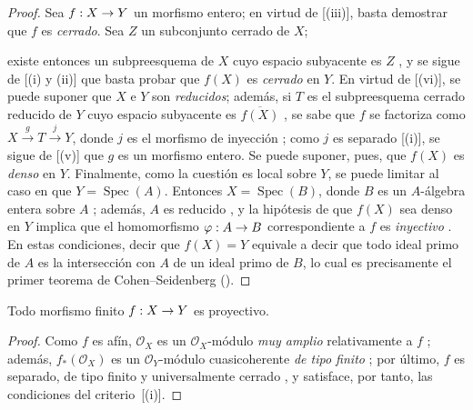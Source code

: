 \documentclass[oneside,10pt]{amsart}
\makeatletter
\newcommand{\ega@arrow}[2]{\mathchoice{#1}{#2}{#2}{#2}}
\renewcommand{\to}{\ega@arrow{\longrightarrow}{\rightarrow}}
\newcommand{\oldpage}[2][]{\marginnote{\normalfont\footnotesize\textbf{#1}~|~#2}\ignorespaces}
\let\EGAOriginalLabel\label
\renewcommand{\label}[1]{\phantomsection\EGAOriginalLabel{#1}}
\makeatother
\begin{document}
\begin{proof}
Sea $f:X\to Y$ un morfismo entero;
en virtud de [(iii)], basta demostrar que $f$ es \emph{cerrado}.
Sea $Z$ un subconjunto cerrado de $X$;


existe entonces un subpreesquema de $X$ 
\oldpage[II]{113}
cuyo espacio subyacente es $Z$ , y se sigue de [(i) y (ii)] que basta probar que $f(X)$ es \emph{cerrado} en $Y$.
En virtud de [(vi)], se puede suponer que $X$ e $Y$ son \emph{reducidos};
además, si $T$ es el subpreesquema cerrado reducido de $Y$ cuyo espacio subyacente es $\overline{f(X)}$ , se sabe que $f$ se factoriza como $X\xrightarrow{g}T\xrightarrow{j}Y$, donde $j$ es el morfismo de inyección ; como $j$ es separado [(i)], se sigue de [(v)] que $g$ es un morfismo entero.
Se puede suponer, pues, que $f(X)$ es \emph{denso} en $Y$.
Finalmente, como la cuestión es local sobre $Y$, se puede limitar al caso en que $Y=\operatorname{Spec}(A)$.
Entonces $X=\operatorname{Spec}(B)$, donde $B$ es un $A$-álgebra entera sobre $A$ ;
además, $A$ es reducido , y la hipótesis de que $f(X)$ sea denso en $Y$ implica que el homomorfismo $\varphi:A\to B$ correspondiente a $f$ es \emph{inyectivo} .
En estas condiciones, decir que $f(X)=Y$ equivale a decir que todo ideal primo de $A$ es la intersección con $A$ de un ideal primo de $B$, lo cual es precisamente el primer teorema de Cohen--Seidenberg (\cite[t.~I, p.~257, th.~3]{I-13}).
\end{proof}

\begin{corollary}[6.1.11]
\label{II.6.1.11-fr}
Todo morfismo finito $f:X\to Y$ es proyectivo.
\end{corollary}

\begin{proof}
Como $f$ es afín, $\mathcal{O}_X$ es un $\mathcal{O}_X$-módulo \emph{muy amplio} relativamente a $f$ ;
además, $f_*(\mathcal{O}_X)$ es un $\mathcal{O}_Y$-módulo cuasicoherente \emph{de tipo finito} ;
por último, $f$ es separado, de tipo finito y universalmente cerrado , y satisface, por tanto, las condiciones del criterio~[(i)].
\end{proof}
\end{document}
